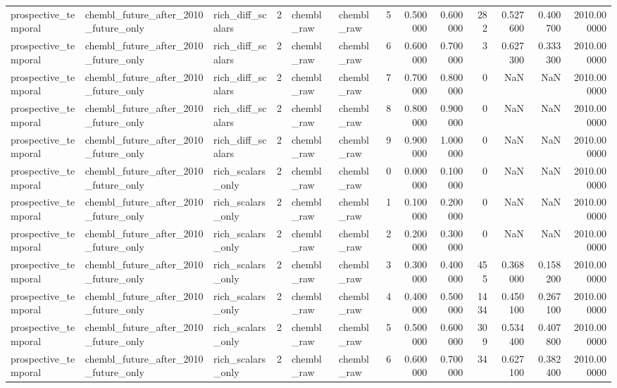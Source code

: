 \begin{longtable}{lllrllrrrrrrr}
prospective\_temporal & chembl\_future\_after\_2010\_future\_only & rich\_diff\_scalars & 2 & chembl\_raw & chembl\_raw & 5 & 0.500000 & 0.600000 & 282 & 0.527600 & 0.400700 & 2010.000000 \\
prospective\_temporal & chembl\_future\_after\_2010\_future\_only & rich\_diff\_scalars & 2 & chembl\_raw & chembl\_raw & 6 & 0.600000 & 0.700000 & 3 & 0.627300 & 0.333300 & 2010.000000 \\
prospective\_temporal & chembl\_future\_after\_2010\_future\_only & rich\_diff\_scalars & 2 & chembl\_raw & chembl\_raw & 7 & 0.700000 & 0.800000 & 0 & NaN & NaN & 2010.000000 \\
prospective\_temporal & chembl\_future\_after\_2010\_future\_only & rich\_diff\_scalars & 2 & chembl\_raw & chembl\_raw & 8 & 0.800000 & 0.900000 & 0 & NaN & NaN & 2010.000000 \\
prospective\_temporal & chembl\_future\_after\_2010\_future\_only & rich\_diff\_scalars & 2 & chembl\_raw & chembl\_raw & 9 & 0.900000 & 1.000000 & 0 & NaN & NaN & 2010.000000 \\
prospective\_temporal & chembl\_future\_after\_2010\_future\_only & rich\_scalars\_only & 2 & chembl\_raw & chembl\_raw & 0 & 0.000000 & 0.100000 & 0 & NaN & NaN & 2010.000000 \\
prospective\_temporal & chembl\_future\_after\_2010\_future\_only & rich\_scalars\_only & 2 & chembl\_raw & chembl\_raw & 1 & 0.100000 & 0.200000 & 0 & NaN & NaN & 2010.000000 \\
prospective\_temporal & chembl\_future\_after\_2010\_future\_only & rich\_scalars\_only & 2 & chembl\_raw & chembl\_raw & 2 & 0.200000 & 0.300000 & 0 & NaN & NaN & 2010.000000 \\
prospective\_temporal & chembl\_future\_after\_2010\_future\_only & rich\_scalars\_only & 2 & chembl\_raw & chembl\_raw & 3 & 0.300000 & 0.400000 & 455 & 0.368000 & 0.158200 & 2010.000000 \\
prospective\_temporal & chembl\_future\_after\_2010\_future\_only & rich\_scalars\_only & 2 & chembl\_raw & chembl\_raw & 4 & 0.400000 & 0.500000 & 1434 & 0.450100 & 0.267100 & 2010.000000 \\
prospective\_temporal & chembl\_future\_after\_2010\_future\_only & rich\_scalars\_only & 2 & chembl\_raw & chembl\_raw & 5 & 0.500000 & 0.600000 & 309 & 0.534400 & 0.407800 & 2010.000000 \\
prospective\_temporal & chembl\_future\_after\_2010\_future\_only & rich\_scalars\_only & 2 & chembl\_raw & chembl\_raw & 6 & 0.600000 & 0.700000 & 34 & 0.627100 & 0.382400 & 2010.000000 \\

\end{longtable}
